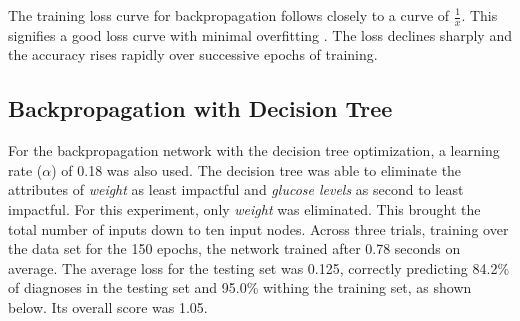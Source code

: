 \documentclass[12pt]{article}
\begin{document}
        The training loss curve for backpropagation follows closely to a curve of \(\frac{1}{x}\).  This signifies a good loss curve with minimal
        overfitting \cite{goodLoss}.  The loss declines sharply and the accuracy rises rapidly over successive epochs of training.
        \pagebreak
    \subsection{Backpropagation with Decision Tree}
        For the backpropagation network with the decision tree optimization, a learning rate (\(\alpha\)) of 0.18 was also used.  
        The decision tree was able to eliminate the attributes of \textit{weight} as least impactful and \textit{glucose levels} as second to least impactful.
        For this experiment, only \textit{weight} was eliminated.  This brought the total number of inputs down to ten input nodes.  Across three trials, training over the data set for
        the 150 epochs, the network trained after 0.78 seconds on average.  The average loss for the testing set was 0.125, 
        correctly predicting 84.2\% of diagnoses in the testing set and 95.0\% withing the training set, as shown below.
        Its overall score was 1.05.
\end{document}
